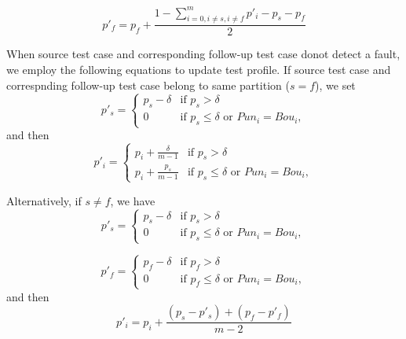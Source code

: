 \documentclass[10pt,journal,compsoc]{IEEEtran}
\begin{document}
\begin{equation}
\label{eq:RAPTKillOneNotSameF}
p'_f = p_f + \displaystyle\frac{1 - \sum\limits_{i = 0, i \ne s, i \ne f}^mp'_i - p_s - p_f}{2}
\end{equation}

When source test case and corresponding follow-up test case donot detect a fault, we employ the following equations to update test profile. If source test case and correspnding follow-up test case belong to same partition ($s = f$), we set
\begin{equation}
\label{eq:RAPTNotKillOneSameS}
p'_s =
\begin{cases}
p_s - \delta & \text{if } p_s > \delta \\
0            & \text{if } p_s \leq \delta \text{ or } Pun_i = Bou_i,
\end{cases}
\end{equation}
and then
\begin{equation}
\label{eq:RAPTNotKillOneSameI}
p'_i =
\begin{cases}
p_i + \displaystyle\frac{\delta}{m - 1} & \text{if } p_s > \delta \\
p_i + \displaystyle\frac{p_s}{m - 1}            & \text{if } p_s \leq \delta \text{ or } Pun_i = Bou_i,
\end{cases}
\end{equation}

Alternatively, if $s \ne f$, we have
\begin{equation}
\label{eq:RAPTNotKillOneSameS}
p'_s =
\begin{cases}
p_s - \delta & \text{if } p_s > \delta \\
0            & \text{if } p_s \leq \delta \text{ or } Pun_i = Bou_i,
\end{cases}
\end{equation}

\begin{equation}
\label{eq:RAPTNotKillOneSameF}
p'_f =
\begin{cases}
p_f - \delta & \text{if } p_f > \delta \\
0            & \text{if } p_f \leq \delta \text{ or } Pun_i = Bou_i,
\end{cases}
\end{equation}
and then
\begin{equation}
\label{eq:RAPTNotKillOneSameI}
p'_i = p_i + \displaystyle\frac{(p_s - p'_s) + (p_f - p'_f)}{m - 2}
\end{equation}
\end{document}
